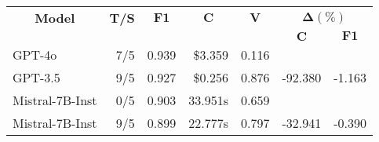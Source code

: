 \begin{tabular*}{\textwidth}{@{\extracolsep{\fill}}lrrrrrr}
\toprule
\multicolumn{1}{c}{\textbf{Model}} & \multicolumn{1}{c}{\textbf{T/S}} & \multicolumn{1}{c}{$\mathbf{F1}$} & \multicolumn{1}{c}{$\mathbf{C}$} & \multicolumn{1}{c}{$\mathbf{V}$} & \multicolumn{2}{c}{$\mathbf{\Delta (\%)}$} \\
& & & & &\multicolumn{1}{c}{$\mathbf{C}$} & \multicolumn{1}{c}{$\mathbf{F1}$} \\
\midrule
GPT-4o  & 7/5 & 0.939 & \$3.359 & 0.116 & & \\
GPT-3.5 & 9/5 & 0.927 & \$0.256 & 0.876 & -92.380 & -1.163 \\
\midrule
Mistral-7B-Inst & 0/5 & 0.903 & 33.951s & 0.659 & & \\
Mistral-7B-Inst & 9/5 & 0.899 & 22.777s & 0.797 & -32.941 & -0.390 \\
\bottomrule
\end{tabular*}